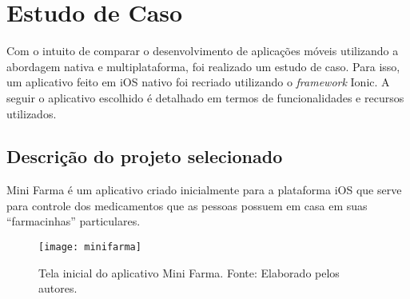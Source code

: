 \chapter{Estudo de Caso} \label{cap:estudodecaso}
Com o intuito de comparar o desenvolvimento de aplicações móveis utilizando a abordagem nativa e multiplataforma, 
foi realizado um estudo de caso. Para isso, um aplicativo feito em iOS 
nativo foi recriado utilizando o \textit{framework} Ionic. A seguir o aplicativo escolhido é detalhado em termos de funcionalidades e recursos utilizados. 

\section{Descrição do projeto selecionado} \label{sec:descricaodoprojeto}

Mini Farma é um aplicativo criado inicialmente para a plataforma iOS que serve para controle dos medicamentos que as 
pessoas possuem em casa em suas ``farmacinhas'' particulares.

\begin{figure}[h]
  \centering
    \texttt{[image: minifarma]}
    \caption[Tela inicial do aplicativo Mini Farma]{ Tela inicial do aplicativo Mini Farma. Fonte: Elaborado pelos autores.}
	\label{fig:minifarma}
\end{figure}

